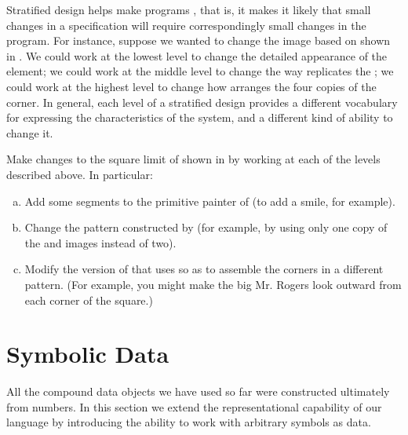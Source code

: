 Stratified design helps make programs , that is, it makes it
likely that small changes in a specification will require correspondingly small
changes in the program.  For instance, suppose we wanted to change the image
based on  shown in .  We could work at the lowest
level to change the detailed appearance of the  element; we could
work at the middle level to change the way  replicates the
; we could work at the highest level to change how
 arranges the four copies of the corner.  In general, each
level of a stratified design provides a different vocabulary for expressing the
characteristics of the system, and a different kind of ability to change it.

\begin{exerciseGroup}
\label{Exercise 2.52}
 Make changes to the square limit
of  shown in  by working at each of the levels
described above.  In particular:

\begin{enumerate}[a.]

\item
Add some segments to the primitive  painter of 
(to add a smile, for example).

\item
Change the pattern constructed by  (for example, by using
only one copy of the  and  images instead of
two).

\item
Modify the version of  that uses  so as
to assemble the corners in a different pattern.  (For example, you might make
the big Mr. Rogers look outward from each corner of the square.)

\end{enumerate}
\end{exerciseGroup}

\section{Symbolic Data}
\label{Section 2.3}

All the compound data objects we have used so far were constructed ultimately
from numbers.  In this section we extend the representational capability of our
language by introducing the ability to work with arbitrary symbols as data.



